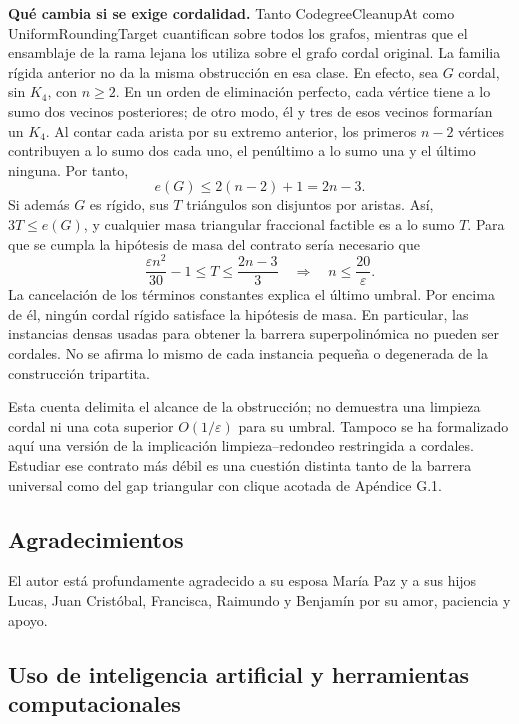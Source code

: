 \documentclass[spanish,11pt,a4paper]{article}
\begin{document}
\textbf{Qué cambia si se exige cordalidad.} Tanto {\ttfamily\small CodegreeClea\discretionary{\hbox{\ensuremath{\hookrightarrow}}}{}{}nupAt} como {\ttfamily\small UniformRound\discretionary{\hbox{\ensuremath{\hookrightarrow}}}{}{}ingTarget} cuantifican sobre todos los grafos, mientras que el ensamblaje de la rama lejana los utiliza sobre el grafo cordal original. La familia rígida anterior no da la misma obstrucción en esa clase. En efecto, sea \(G\) cordal, sin \(K_4\), con \(n\ge2\). En un orden de eliminación perfecto, cada vértice tiene a lo sumo dos vecinos posteriores; de otro modo, él y tres de esos vecinos formarían un \(K_4\). Al contar cada arista por su extremo anterior, los primeros \(n-2\) vértices contribuyen a lo sumo dos cada uno, el penúltimo a lo sumo una y el último ninguna. Por tanto, \[
e(G)\le2(n-2)+1=2n-3.
\tag{G.4}
\] Si además \(G\) es rígido, sus \(T\) triángulos son disjuntos por aristas. Así, \(3T\le e(G)\), y cualquier masa triangular fraccional factible es a lo sumo \(T\). Para que se cumpla la hipótesis de masa del contrato sería necesario que \[
\frac{\varepsilon n^2}{30}-1
\le T\le\frac{2n-3}{3}
\quad\Longrightarrow\quad n\le\frac{20}{\varepsilon}.
\tag{G.5}
\] La cancelación de los términos constantes explica el último umbral. Por encima de él, ningún cordal rígido satisface la hipótesis de masa. En particular, las instancias densas usadas para obtener la barrera superpolinómica no pueden ser cordales. No se afirma lo mismo de cada instancia pequeña o degenerada de la construcción tripartita.

Esta cuenta delimita el alcance de la obstrucción; no demuestra una limpieza cordal ni una cota superior \(O(1/\varepsilon)\) para su umbral. Tampoco se ha formalizado aquí una versión de la implicación limpieza--redondeo restringida a cordales. Estudiar ese contrato más débil es una cuestión distinta tanto de la barrera universal como del gap triangular con clique acotada de Apéndice G.1.

\subsection{Agradecimientos}\label{agradecimientos}

El autor está profundamente agradecido a su esposa María Paz y a sus hijos Lucas, Juan Cristóbal, Francisca, Raimundo y Benjamín por su amor, paciencia y apoyo.

\subsection{Uso de inteligencia artificial y herramientas computacionales}\label{uso-de-inteligencia-artificial-y-herramientas-computacionales}
\end{document}
